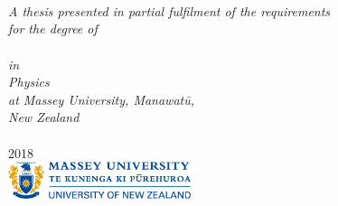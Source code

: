 \documentclass[11pt, a4paper, oneside]{Thesis} %
\begin{document}
\begin{titlepage}
\begin{center}


\HRule \\[0.4cm] %
{\huge \bfseries \ttitle}\\[0.4cm] %
\HRule \\[1.5cm] %
\large \textit{A thesis presented in partial fulfilment of the requirements\\
for the degree of\\[3.0cm]
\degreename\\
in\\
Physics\\[3.0cm]
at Massey University, Manawatū,\\
New Zealand} \\[2.0cm]

\Large{\authornames}\\2018\\[1.0cm]





%


\href{http://www.massey.ac.nz}{\includegraphics[width=0.4\textwidth]{./Pictures/masseyUniversityLogo.png}}

\vfill

\end{center}
\end{titlepage}
\end{document}
